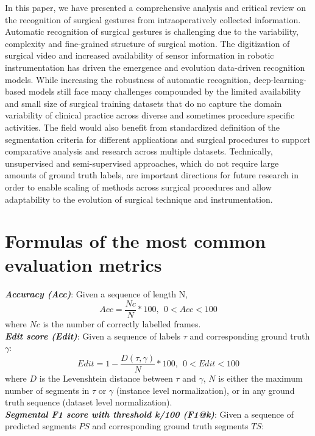 \documentclass[journal]{IEEEtran}
\begin{document}
In this paper, we have presented a comprehensive analysis and critical review on the recognition of surgical gestures from intraoperatively collected information. Automatic recognition of surgical gestures is challenging due to the variability, complexity and fine-grained structure of surgical motion. The digitization of surgical video and increased availability of sensor information in robotic instrumentation has driven the emergence and evolution data-driven recognition models. While increasing the robustness of automatic recognition, deep-learning-based models still face many challenges compounded by the limited availability and small size of surgical training datasets that do no capture the domain variability of clinical practice across diverse and sometimes procedure specific activities. 
The field would also benefit from standardized definition of the segmentation criteria for different applications and surgical procedures to support comparative analysis and research across multiple datasets.
Technically, unsupervised and semi-supervised approaches, which do not require large amounts of ground truth labels, are important directions for future research in order to enable scaling of methods across surgical procedures and allow adaptability to the evolution of surgical technique and instrumentation.

\appendices
\section{Formulas of the most common evaluation metrics} \label{appendix}

\noindent \textbf{\textit{Accuracy (Acc)}}: Given a sequence of length N, \\
$$Acc=\frac{Nc}{N}*100, \ \ 0 < Acc < 100 $$
where $Nc$ is the number of correctly labelled frames.\\

\noindent \textbf{\textit{Edit score (Edit)}}: Given a sequence of labels $\tau$ and corresponding ground truth $\gamma$: \\
$$Edit=1-\frac{D(\tau,\gamma)}{N}*100, \ \ 0 < Edit < 100 $$
where $D$ is the Levenshtein distance between $\tau$ and $\gamma$, $N$ is either the maximum number of segments in $\tau$ or $\gamma$ (instance level normalization), or in any ground truth sequence (dataset level normalization).\\

\noindent \textbf{\textit{Segmental F1 score with threshold k/100 (F1@k)}}: Given a sequence of predicted segments $PS$ and corresponding ground truth segments $TS$: \\
\end{document}
